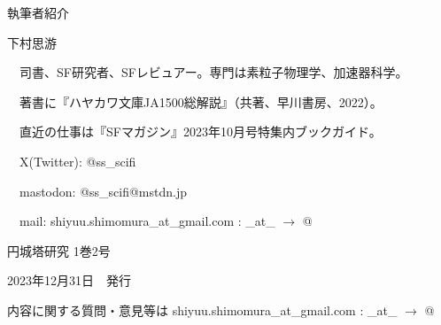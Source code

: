 \documentclass[10pt, a5paper, twoside]{jsarticle}
\theoremstyle{definition}
\begin{document}
	{\large 執筆者紹介}

	\vspace{3mm}

	下村思游

	　司書、SF研究者、SFレビュアー。専門は素粒子物理学、加速器科学。

	　著書に『ハヤカワ文庫JA1500総解説』（共著、早川書房、2022）。

	　直近の仕事は『SFマガジン』2023年10月号特集内ブックガイド。

	　X(Twitter): @ss\_scifi

	　mastodon: @ss\_scifi@mstdn.jp

	　mail: shiyuu.shimomura\_at\_gmail.com : \_at\_ $\rightarrow$ @

	\vfill

	\hrulefill

	\center

	{\Large 円城塔研究 1巻2号}

	2023年12月31日　発行


	\hrulefill

	内容に関する質問・意見等は shiyuu.shimomura\_at\_gmail.com : \_at\_ $\rightarrow$ @
\end{document}

